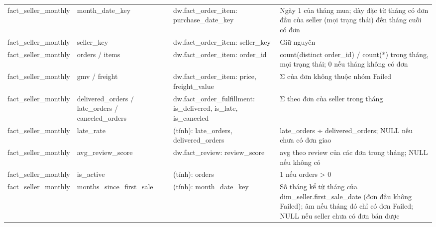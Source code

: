 {\begin{longtable}{p{2.4cm}p{3.1cm}p{3.6cm}p{5.4cm}}
fact\_seller\_monthly & month\_date\_key & dw.fact\_order\_item: purchase\_date\_key & Ngày 1 của tháng mua; dày đặc từ tháng có đơn đầu của seller (mọi trạng thái) đến tháng cuối có đơn \\
fact\_seller\_monthly & seller\_key & dw.fact\_order\_item: seller\_key & Giữ nguyên \\
fact\_seller\_monthly & orders / items & dw.fact\_order\_item: order\_id & count(distinct order\_id) / count(*) trong tháng, mọi trạng thái; 0 nếu tháng không có đơn \\
fact\_seller\_monthly & gmv / freight & dw.fact\_order\_item: price, freight\_value & Σ của đơn không thuộc nhóm Failed \\
fact\_seller\_monthly & delivered\_orders / late\_orders / canceled\_orders & dw.fact\_order\_fulfillment: is\_delivered, is\_late, is\_canceled & Σ theo đơn của seller trong tháng \\
fact\_seller\_monthly & late\_rate & (tính): late\_orders, delivered\_orders & late\_orders ÷ delivered\_orders; NULL nếu chưa có đơn giao \\
fact\_seller\_monthly & avg\_review\_score & dw.fact\_review: review\_score & avg theo review của các đơn trong tháng; NULL nếu không có \\
fact\_seller\_monthly & is\_active & (tính): orders & 1 nếu orders > 0 \\
fact\_seller\_monthly & months\_since\_first\_sale & (tính): month\_date\_key & Số tháng kể từ tháng của dim\_seller.first\_sale\_date (đơn đầu không Failed); âm nếu tháng đó chỉ có đơn Failed; NULL nếu seller chưa có đơn bán được \\
\end{longtable}}
